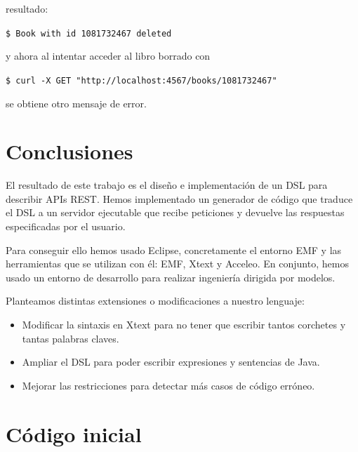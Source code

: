 \documentclass[runningheads]{llncs}
\begin{document}
resultado:

\texttt{\$ Book with id 1081732467 deleted}

y ahora al intentar acceder al libro borrado con

\texttt{\$ curl -X GET "http://localhost:4567/books/1081732467"}

se obtiene otro mensaje de error.




\section{Conclusiones}
\label{sc:concl}

El resultado de este trabajo es el diseño e implementación de un DSL
para describir APIs REST. Hemos implementado un generador de código que
traduce el DSL a un servidor ejecutable que recibe peticiones y devuelve
las respuestas especificadas por el usuario.

Para conseguir ello hemos usado Eclipse, concretamente el entorno EMF
y las herramientas que se utilizan con él: EMF, Xtext y Acceleo. En
conjunto, hemos usado un entorno de desarrollo para realizar ingeniería
dirigida por modelos.

Planteamos distintas extensiones o modificaciones a nuestro lenguaje:

\begin{itemize}
    \item Modificar la sintaxis en Xtext para no tener que escribir tantos
        corchetes y tantas palabras claves.
    \item Ampliar el DSL para poder escribir expresiones y sentencias
        de Java.
    \item Mejorar las restricciones para detectar más casos de código
        erróneo.
\end{itemize}

\newpage

\appendix
\section{Código inicial}
\label{app:codigo-inicial}
\end{document}

